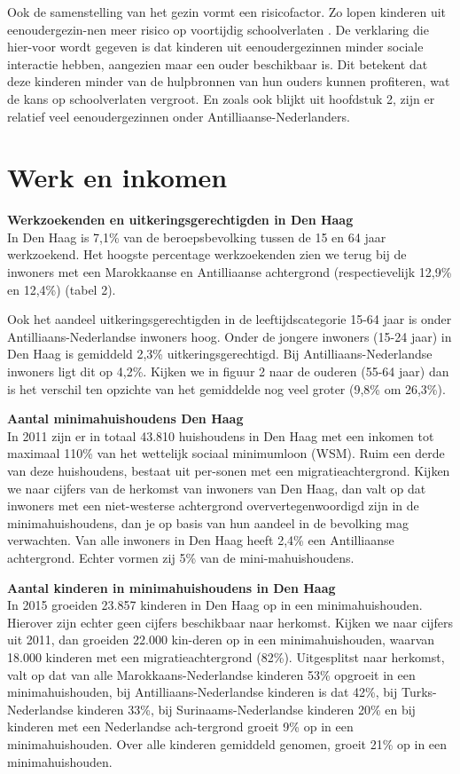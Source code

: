 \documentclass[]{book}
\begin{document}
Ook de samenstelling van het gezin vormt een risicofactor. Zo lopen
kinderen uit eenoudergezin-nen meer risico op voortijdig schoolverlaten
\citep{Traag2008}. De verklaring die hier-voor wordt gegeven is dat
kinderen uit eenoudergezinnen minder sociale interactie hebben,
aangezien maar een ouder beschikbaar is. Dit betekent dat deze kinderen
minder van de hulpbronnen van hun ouders kunnen profiteren, wat de kans
op schoolverlaten vergroot. En zoals ook blijkt uit hoofdstuk 2, zijn er
relatief veel eenoudergezinnen onder Antilliaanse-Nederlanders.

\hypertarget{werk-en-inkomen}{%
\chapter*{Werk en inkomen}\label{werk-en-inkomen}}

\textbf{Werkzoekenden en uitkeringsgerechtigden in Den Haag}\\
In Den Haag is 7,1\% van de beroepsbevolking tussen de 15 en 64 jaar
werkzoekend. Het hoogste percentage werkzoekenden zien we terug bij de
inwoners met een Marokkaanse en Antilliaanse achtergrond
(respectievelijk 12,9\% en 12,4\%) (tabel 2).

Ook het aandeel uitkeringsgerechtigden in de leeftijdscategorie 15-64
jaar is onder Antilliaans-Nederlandse inwoners hoog. Onder de jongere
inwoners (15-24 jaar) in Den Haag is gemiddeld 2,3\%
uitkeringsgerechtigd. Bij Antilliaans-Nederlandse inwoners ligt dit op
4,2\%. Kijken we in figuur 2 naar de ouderen (55-64 jaar) dan is het
verschil ten opzichte van het gemiddelde nog veel groter (9,8\% om
26,3\%).

\textbf{Aantal minimahuishoudens Den Haag}\\
In 2011 zijn er in totaal 43.810 huishoudens in Den Haag met een inkomen
tot maximaal 110\% van het wettelijk sociaal minimumloon (WSM). Ruim een
derde van deze huishoudens, bestaat uit per-sonen met een
migratieachtergrond. Kijken we naar cijfers van de herkomst van inwoners
van Den Haag, dan valt op dat inwoners met een niet-westerse achtergrond
oververtegenwoordigd zijn in de minimahuishoudens, dan je op basis van
hun aandeel in de bevolking mag verwachten. Van alle inwoners in Den
Haag heeft 2,4\% een Antilliaanse achtergrond. Echter vormen zij 5\% van
de mini-mahuishoudens.

\textbf{Aantal kinderen in minimahuishoudens in Den Haag}\\
In 2015 groeiden 23.857 kinderen in Den Haag op in een minimahuishouden.
Hierover zijn echter geen cijfers beschikbaar naar herkomst. Kijken we
naar cijfers uit 2011, dan groeiden 22.000 kin-deren op in een
minimahuishouden, waarvan 18.000 kinderen met een migratieachtergrond
(82\%). Uitgesplitst naar herkomst, valt op dat van alle
Marokkaans-Nederlandse kinderen 53\% opgroeit in een minimahuishouden,
bij Antilliaans-Nederlandse kinderen is dat 42\%, bij Turks-Nederlandse
kinderen 33\%, bij Surinaams-Nederlandse kinderen 20\% en bij kinderen
met een Nederlandse ach-tergrond groeit 9\% op in een minimahuishouden.
Over alle kinderen gemiddeld genomen, groeit 21\% op in een
minimahuishouden.
\end{document}
